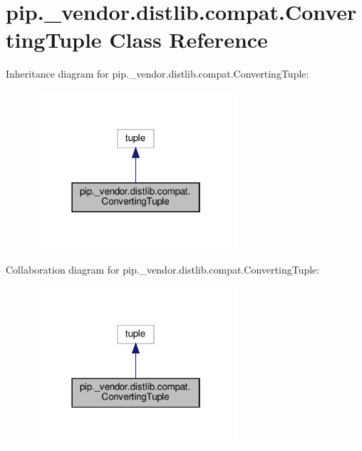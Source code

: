 \hypertarget{classpip_1_1__vendor_1_1distlib_1_1compat_1_1ConvertingTuple}{}\section{pip.\+\_\+vendor.\+distlib.\+compat.\+Converting\+Tuple Class Reference}
\label{classpip_1_1__vendor_1_1distlib_1_1compat_1_1ConvertingTuple}


Inheritance diagram for pip.\+\_\+vendor.\+distlib.\+compat.\+Converting\+Tuple\+:
\nopagebreak
\begin{figure}[H]
\begin{center}
\leavevmode
\includegraphics[width=214pt]{classpip_1_1__vendor_1_1distlib_1_1compat_1_1ConvertingTuple__inherit__graph}
\end{center}
\end{figure}


Collaboration diagram for pip.\+\_\+vendor.\+distlib.\+compat.\+Converting\+Tuple\+:
\nopagebreak
\begin{figure}[H]
\begin{center}
\leavevmode
\includegraphics[width=214pt]{classpip_1_1__vendor_1_1distlib_1_1compat_1_1ConvertingTuple__coll__graph}
\end{center}
\end{figure}
